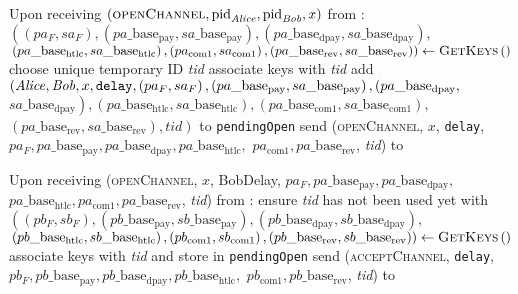 \begin{algorithmic}[1]
    \State Upon receiving $\left(\textsc{openChannel}, \mathrm{pid}_{\mathit{Alice}},
    \mathrm{pid}_{\mathit{Bob}}, x\right)$ from \environment:
    \Indent
      \State $\left(\left(pa_F, sa_F\right),
      \left(pa\_\mathrm{base}_{\mathrm{pay}},
      sa\_\mathrm{base}_{\mathrm{pay}}\right),
      \left(pa\_\mathrm{base}_{\mathrm{dpay}},
      sa\_\mathrm{base}_{\mathrm{dpay}}\right),\right.$
      $\left.\left(pa\_\mathrm{base}_{\mathrm{htlc}},
      sa\_\mathrm{base}_{\mathrm{htlc}}\right), \left(pa_{\mathrm{com}1},
      sa_{\mathrm{com}1}\right), \left(pa\_\mathrm{base}_{\mathrm{rev}},
      sa\_\mathrm{base}_{\mathrm{rev}}\right)\right) \gets
      \textsc{GetKeys}\left(\right)$ 
      \State choose unique temporary ID \textit{tid} 
      \State associate keys with \textit{tid}
      \State add $\left(\mathit{Alice}, \mathit{Bob}, x, \mathtt{delay}, \left(pa_F,
      sa_F\right), \left(pa\_\mathrm{base}_{\mathrm{pay}},
      sa\_\mathrm{base}_{\mathrm{pay}}\right),
      \left(pa\_\mathrm{base}_{\mathrm{dpay}},\right.\right.$
      $\left.\left.sa\_\mathrm{base}_{\mathrm{dpay}}\right),
      \left(pa\_\mathrm{base}_{\mathrm{htlc}},
      sa\_\mathrm{base}_{\mathrm{htlc}}\right),
      \left(pa\_\mathrm{base}_{\mathrm{com}1},
      sa\_\mathrm{base}_{\mathrm{com}1}\right),\right.$
      $\left.\left(pa\_\mathrm{base}_{\mathrm{rev}},
      sa\_\mathrm{base}_{\mathrm{rev}}\right), \mathit{tid}\right)$ to
      \texttt{pendingOpen}
      \State send (\textsc{openChannel}, $x$, \texttt{delay}, $pa_F,
      pa\_\mathrm{base}_{\mathrm{pay}}, pa\_\mathrm{base}_{\mathrm{dpay}},
      pa\_\mathrm{base}_{\mathrm{htlc}},$ $pa_{\mathrm{com}1},
      pa\_\mathrm{base}_{\mathrm{rev}}$, \textit{tid}) to \bob
    \EndIndent
    \State

    \State Upon receiving (\textsc{openChannel}, $x$, BobDelay, $pa_F,
    pa\_\mathrm{base}_{\mathrm{pay}}, pa\_\mathrm{base}_{\mathrm{dpay}},$
    $pa\_\mathrm{base}_{\mathrm{htlc}}, pa_{\mathrm{com}1},
    pa\_\mathrm{base}_{\mathrm{rev}}$, \textit{tid}) from \bob:
    \Indent
      \State ensure \textit{tid} has not been used yet with \bob
      \State $\left(\left(pb_F, sb_F\right),
      \left(pb\_\mathrm{base}_{\mathrm{pay}},
      sb\_\mathrm{base}_{\mathrm{pay}}\right),
      \left(pb\_\mathrm{base}_{\mathrm{dpay}},
      sb\_\mathrm{base}_{\mathrm{dpay}}\right),\right.$
      $\left.\left(pb\_\mathrm{base}_{\mathrm{htlc}},
      sb\_\mathrm{base}_{\mathrm{htlc}}\right),
      \left(pb_{\mathrm{com}1}, sb_{\mathrm{com}1}\right),
      \left(pb\_\mathrm{base}_{\mathrm{rev}},
      sb\_\mathrm{base}_{\mathrm{rev}}\right)\right) \gets
      \textsc{GetKeys}\left(\right)$ 
      \State associate keys with \textit{tid} and store in \texttt{pendingOpen}
      \State send (\textsc{acceptChannel}, \texttt{delay}, $pb_F,
      pb\_\mathrm{base}_{\mathrm{pay}}, pb\_\mathrm{base}_{\mathrm{dpay}},
      pb\_\mathrm{base}_{\mathrm{htlc}},$ $pb_{\mathrm{com}1},
      pb\_\mathrm{base}_{\mathrm{rev}}$, \textit{tid}) to \bob
    \EndIndent
    \State


\end{algorithmic}
